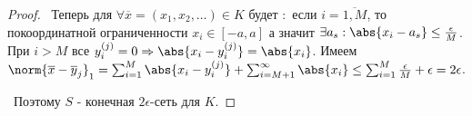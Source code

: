 \begin{proof}
\smallskip
\noindent\textbullet~Теперь для $\forall \overline{x} = (x_1, x_2, \dots) \in K$ будет $:$ если $i = \overline{1, M}$, то покоординатной ограниченности $x_i \in [-a, a]$ 
а значит $\exists a_s : \abs{x_i - a_s} \le \frac{\epsilon}{M}$. При $i > M$ все $y_i^{(j)} = 0 \Rightarrow \abs{x_i - y_i^{(j)}} = \abs{x_i}$. Имеем $\norm{\overline{x} -
\overline{y}_j}_1 = \sum_{i = 1}^M \abs{x_i - y_i^{(j)}} + \sum_{i = M + 1}^\infty \abs{x_i} \le \sum_{i = 1}^M \frac{\epsilon}{M} + \epsilon = 2 \epsilon$.

\smallskip
\noindent\textbullet~Поэтому $S$ - конечная $2\epsilon$-сеть для $K$.
\end{proof}